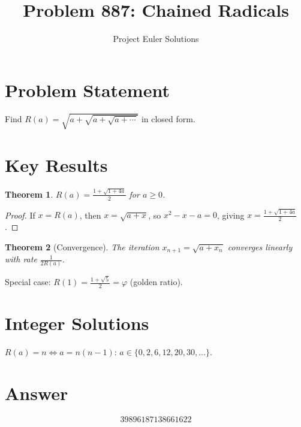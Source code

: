 \documentclass[11pt]{article}
\title{Problem 887: Chained Radicals}
\author{Project Euler Solutions}
\date{}
\newtheorem{theorem}{Theorem}
\begin{document}
\maketitle

\section{Problem Statement}
Find $R(a) = \sqrt{a + \sqrt{a + \sqrt{a + \cdots}}}$ in closed form.

\section{Key Results}

\begin{theorem}
$R(a) = \frac{1 + \sqrt{1 + 4a}}{2}$ for $a \ge 0$.
\end{theorem}

\begin{proof}
If $x = R(a)$, then $x = \sqrt{a + x}$, so $x^2 - x - a = 0$, giving $x = \frac{1+\sqrt{1+4a}}{2}$.
\end{proof}

\begin{theorem}[Convergence]
The iteration $x_{n+1} = \sqrt{a + x_n}$ converges linearly with rate $\frac{1}{2R(a)}$.
\end{theorem}

Special case: $R(1) = \frac{1+\sqrt{5}}{2} = \varphi$ (golden ratio).

\section{Integer Solutions}
$R(a) = n \iff a = n(n-1)$: $a \in \{0, 2, 6, 12, 20, 30, \ldots\}$.

\section{Answer}

\[
\boxed{39896187138661622}
\]
\end{document}

